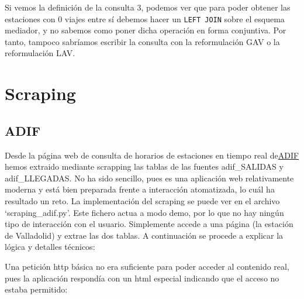 Si vemos la definición de la consulta 3, podemos ver que para poder
obtener las estaciones con 0 viajes entre sí debemos hacer un
\texttt{LEFT\ JOIN} sobre el esquema mediador, y no sabemos como poner
dicha operación en forma conjuntiva. Por tanto, tampoco sabríamos
escribir la consulta con la reformulación GAV o la reformulación LAV.

\section{Scraping}\label{scraping}

\subsection{ADIF}\label{adif}

Desde la página web de consulta de horarios de estaciones en tiempo real
de\href{https://www.adif.es/viajeros/estaciones}{ADIF} hemos extraido
mediante scrapping las tablas de las fuentes adif\_SALIDAS y
adif\_LLEGADAS. No ha sido sencillo, pues es una aplicación web
relativamente moderna y está bien preparada frente a interacción
atomatizada, lo cuál ha resultado un reto. La implementación del
scraping se puede ver en el archivo `scraping\_adif.py'. Este fichero
actua a modo demo, por lo que no hay ningún tipo de interacción con el
usuario. Simplemente accede a una página (la estación de Valladolid) y
extrae las dos tablas. A continuación se procede a explicar la lógica y
detalles técnicos:

Una petición http básica no era suficiente para poder acceder al
contenido real, pues la aplicación respondía con un html especial
indicando que el acceso no estaba permitido:

\begin{Shaded}
\begin{Highlighting}[]
\DataTypeTok{\textless{}}\DataTypeTok{\textgreater{}}
\DataTypeTok{\textless{}}\DataTypeTok{\textgreater{}}
\DataTypeTok{\textless{}}\DataTypeTok{\textgreater{}}\DataTypeTok{\textless{}/}\DataTypeTok{\textgreater{}}
\DataTypeTok{\textless{}/}\DataTypeTok{\textgreater{}}
\DataTypeTok{\textless{}}\DataTypeTok{\textgreater{}}
\DataTypeTok{\textless{}}\DataTypeTok{\textgreater{}}\DataTypeTok{\textless{}/}\DataTypeTok{\textgreater{}}

\DataTypeTok{\textless{}/}\DataTypeTok{\textgreater{}}
\end{Highlighting}
\end{Shaded}

